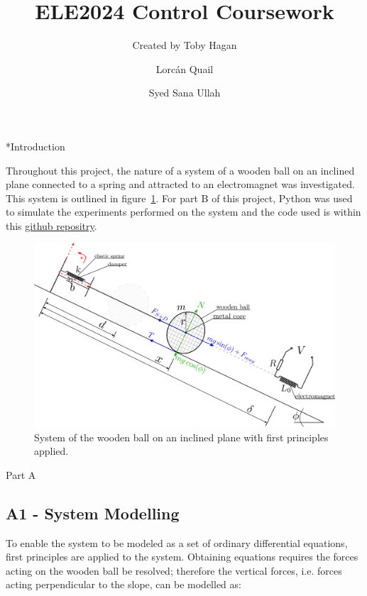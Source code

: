 \documentclass[a4paper,10pt,reqno]{amsart}
\title[ELE2024 Coursework]{\Huge ELE2024 Control Coursework}
\author[T. Hagan]{\Large Created by Toby Hagan}
\author[L. Quail]{\Large Lorcán Quail}
\author[S. Ullah]{\Large Syed Sana Ullah}
\makeatletter
\def\section{\@startsection{section}{1}%
  \z@{.7\linespacing\@plus\linespacing}{.5\linespacing}%
  {\bfseries\scshape\centering}}
\newenvironment{nouppercase}{%
  \let\uppercase\relax%
  \renewcommand{\uppercasenonmath}[1]{}}{}
\numberwithin{equation}{section}
\makeatother
\begin{document}
\begin{nouppercase}
\maketitle
\end{nouppercase}

\section*{Introduction}

\par Throughout this project, the nature of a system of a wooden ball on an inclined plane connected to a spring and attracted to an electromagnet was investigated. This system is outlined in figure~\ref{fig:A1Diagram}. For part B of this project, Python was used to simulate the experiments performed on the system and the code used is within this \href{https://github.com/Lorcan-Q/Control_Coursework}{github repositry}.

\begin{figure}[h]
\label{fig:A1Diagram}
 \centering
 \includegraphics[width=0.6\linewidth]{Figures/FreeBody.eps}
 \caption{System of the wooden ball on an inclined plane with first principles applied.}
\end{figure}

\section{Part A}

\subsection{A1 - System Modelling}\label{sec:A1}

\par To enable the system to be modeled as a set of ordinary differential equations, first principles are applied to the system. Obtaining equations requires the forces acting on the wooden ball be resolved; therefore the vertical forces, i.e. forces acting perpendicular to the slope, can be modelled as:
\end{document}
